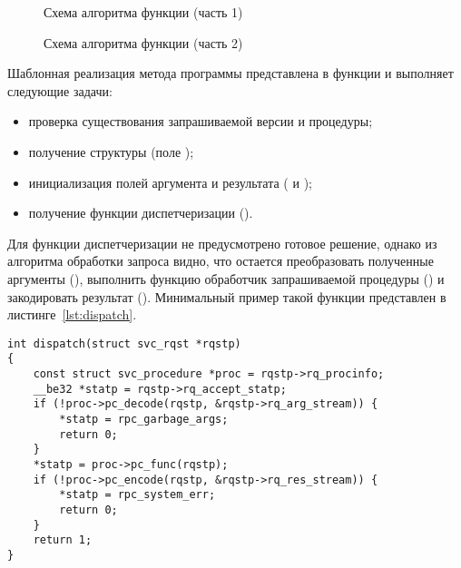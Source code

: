 \clearpage
\vspace*{\fill}
\begin{figure}[!h]
    \centering
    \def\svgwidth{\textwidth}
    
    \caption{Схема алгоритма функции  (часть 1)}
    \label{fig:algorithm_svc_process_common_1}
\end{figure}
\vfill

\clearpage
\vspace*{\fill}
\begin{figure}[!h]
    \centering
    \def\svgwidth{\textwidth}
    
    \caption{Схема алгоритма функции  (часть 2)}
    \label{fig:algorithm_svc_process_common_2}
\end{figure}
\vfill

\clearpage

Шаблонная реализация метода программы  представлена в
функции  и выполняет следующие задачи:
\begin{itemize}
    \item проверка существования запрашиваемой версии и процедуры;
    \item получение структуры  (поле );
    \item инициализация полей аргумента и результата
          ( и );
    \item получение функции диспетчеризации ().
\end{itemize}

Для функции диспетчеризации не предусмотрено готовое решение, однако из
алгоритма обработки запроса видно, что остается преобразовать полученные
аргументы (), выполнить функцию обработчик запрашиваемой
процедуры () и закодировать результат ().
Минимальный пример такой функции представлен в листинге~\ref{lst:dispatch}.

\begin{lstlisting}[caption={Минимальная реализация функции диспетчеризации}, label={lst:dispatch}]
int dispatch(struct svc_rqst *rqstp)
{
    const struct svc_procedure *proc = rqstp->rq_procinfo;
    __be32 *statp = rqstp->rq_accept_statp;
    if (!proc->pc_decode(rqstp, &rqstp->rq_arg_stream)) {
        *statp = rpc_garbage_args;
        return 0;
    }
    *statp = proc->pc_func(rqstp);
    if (!proc->pc_encode(rqstp, &rqstp->rq_res_stream)) {
        *statp = rpc_system_err;
        return 0;
    }
    return 1;
}
\end{lstlisting}

